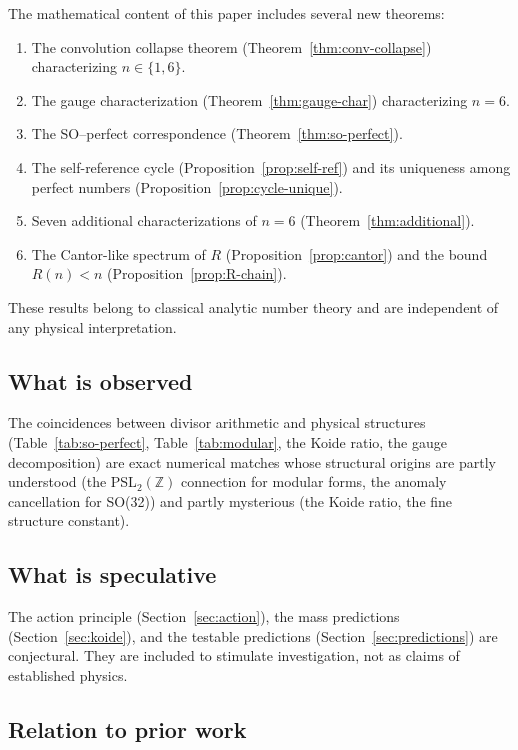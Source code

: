 \documentclass[11pt,letterpaper]{article}
\theoremstyle{definition}
\theoremstyle{remark}
\newcommand{\ZZ}{\mathbb{Z}}
\begin{document}
The mathematical content of this paper includes several new theorems:
\begin{enumerate}
\item The convolution collapse theorem (Theorem~\ref{thm:conv-collapse}) 
      characterizing $n \in \{1,6\}$.
\item The gauge characterization (Theorem~\ref{thm:gauge-char}) 
      characterizing $n = 6$.
\item The SO--perfect correspondence (Theorem~\ref{thm:so-perfect}).
\item The self-reference cycle (Proposition~\ref{prop:self-ref}) and its 
      uniqueness among perfect numbers (Proposition~\ref{prop:cycle-unique}).
\item Seven additional characterizations of $n=6$ (Theorem~\ref{thm:additional}).
\item The Cantor-like spectrum of $R$ (Proposition~\ref{prop:cantor}) and the 
      bound $R(n) < n$ (Proposition~\ref{prop:R-chain}).
\end{enumerate}

These results belong to classical analytic number theory and are independent 
of any physical interpretation.

\subsection{What is observed}

The coincidences between divisor arithmetic and physical structures 
(Table~\ref{tab:so-perfect}, Table~\ref{tab:modular}, 
the Koide ratio, the gauge decomposition) are exact numerical matches 
whose structural origins are partly understood (the PSL$_2(\ZZ)$ connection 
for modular forms, the anomaly cancellation for SO(32)) and partly mysterious 
(the Koide ratio, the fine structure constant).

\subsection{What is speculative}

The action principle (Section~\ref{sec:action}), the mass predictions 
(Section~\ref{sec:koide}), and the testable predictions 
(Section~\ref{sec:predictions}) are conjectural. They are included 
to stimulate investigation, not as claims of established physics.

\subsection{Relation to prior work}
\end{document}
